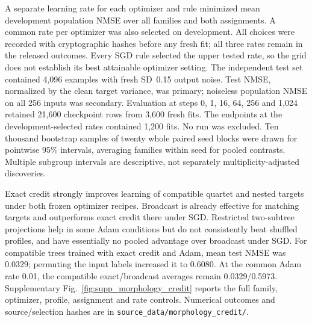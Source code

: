A separate learning rate for each optimizer and rule minimized mean development population NMSE over all families and both assignments. A common rate per optimizer was also selected on development. All choices were recorded with cryptographic hashes before any fresh fit; all three rates remain in the released outcomes. Every SGD rule selected the upper tested rate, so the grid does not establish its best attainable optimizer setting. The independent test set contained 4,096 examples with fresh SD~0.15 output noise. Test NMSE, normalized by the clean target variance, was primary; noiseless population NMSE on all 256 inputs was secondary. Evaluation at steps 0, 1, 16, 64, 256 and 1,024 retained 21,600 checkpoint rows from 3,600 fresh fits. The endpoints at the development-selected rates contained 1,200 fits. No run was excluded. Ten thousand bootstrap samples of twenty whole paired seed blocks were drawn for pointwise 95\% intervals, averaging families within seed for pooled contrasts. Multiple subgroup intervals are descriptive, not separately multiplicity-adjusted discoveries.

Exact credit strongly improves learning of compatible quartet and nested targets under both frozen optimizer recipes. Broadcast is already effective for matching targets and outperforms exact credit there under SGD. Restricted two-subtree projections help in some Adam conditions but do not consistently beat shuffled profiles, and have essentially no pooled advantage over broadcast under SGD. For compatible trees trained with exact credit and Adam, mean test NMSE was 0.0329; permuting the input labels increased it to 0.6080. At the common Adam rate 0.01, the compatible exact/broadcast averages remain 0.0329/0.5973. Supplementary Fig.~\ref{fig:supp_morphology_credit} reports the full family, optimizer, profile, assignment and rate controls. Numerical outcomes and source/selection hashes are in \texttt{source\_data/morphology\_credit/}.
